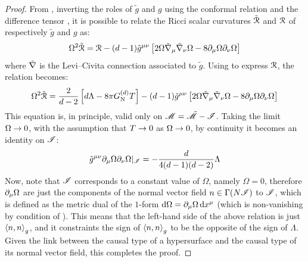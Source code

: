 \begin{proofbox}
  \begin{proof}
    From , inverting the roles of $ \tilde{g} $ and $ g $ using the conformal relation  and the difference tensor , it is possible to relate the Ricci scalar curvatures $ \tilde{\EuScript{R}} $ and $ \EuScript{R} $ of respectively $ \tilde{g} $ and $ g $ as:
    \begin{equation}
      \Omega^2 \tilde{\EuScript{R}} = \EuScript{R} - (d-1) \tilde{g}^{\mu \nu} \left[ 2 \Omega \tilde{\nabla}_\mu \tilde{\nabla}_\nu \Omega - 8 \partial_\mu \Omega \partial_\nu \Omega \right]
      \label{eq:conformal-ricci}
    \end{equation}
    where $ \tilde{\nabla} $ is the Levi--Civita connection associated to $ \tilde{g} $. Using  to express $ \EuScript{R} $, the relation becomes:
    \begin{equation*}
      \Omega^2 \tilde{\EuScript{R}} = \frac{2}{d-2} \left[ d \Lambda - 8 \pi G_\text{N}^{(d)} T \right] - (d-1) \tilde{g}^{\mu \nu} \left[ 2 \Omega \tilde{\nabla}_\mu \tilde{\nabla}_\nu \Omega - 8 \partial_\mu \Omega \partial_\nu \Omega \right]
    \end{equation*}
    This equation is, in principle, valid only on $ \mathscr{M} = \tilde{\mathscr{M}} - \mathscr{I} $. Taking the limit $ \Omega \rightarrow 0 $, with the assumption that $ T \rightarrow 0 $ as $ \Omega \rightarrow 0 $, by continuity it becomes an identity on $ \mathscr{I} $:
    \begin{equation*}
      \tilde{g}^{\mu \nu} \partial_\mu \Omega \partial_\nu \Omega \vert_\mathscr{I} = - \frac{d}{4 (d-1) (d-2)} \Lambda
    \end{equation*}
    Now, note that $ \mathscr{I} $ corresponds to a constant value of $ \Omega $, namely $ \Omega = 0 $, therefore $ \partial_\mu \Omega $ are just the components of the normal vector field $ n \in \Gamma(N\mathscr{I}) $ to $ \mathscr{I} $, which is defined as the metric dual of the $ 1 $-form $ \mathrm{d} \Omega = \partial_\mu \Omega \, \mathrm{d} x^\mu $ (which is non-vanishing by condition  of ). This means that the left-hand side of the above relation is just $ \braket{n,n}_g $, and it constraints the sign of $ \braket{n,n}_g $ to be the opposite of the sign of $ \Lambda $. Given the link between the causal type of a hypersurface and the causal type of its normal vector field, this completes the proof.
  \end{proof}
\end{proofbox}

